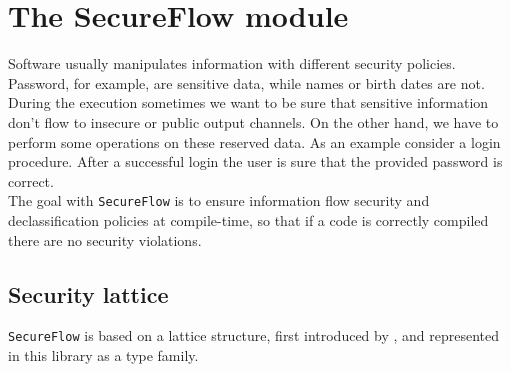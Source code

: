 \section{The SecureFlow module}\label{sec:flow}
Software usually manipulates information with different security policies. Password, for example, are sensitive data, while names or birth dates are not. During the execution sometimes we want to be sure that sensitive information don't flow to insecure or public output channels. On the other hand, we have to perform some operations on these reserved data. As an example consider a login procedure. After a successful login the user is sure that the provided password is correct. \\
The goal with \texttt{SecureFlow} is to ensure information flow security and declassification policies at compile-time, so that if a code is correctly compiled there are no security violations.

\subsection{Security lattice}
\texttt{SecureFlow} is based on a lattice structure, first introduced by \citeauthor{denning1976lattice} \cite{denning1976lattice}, and represented in this library as a type family.